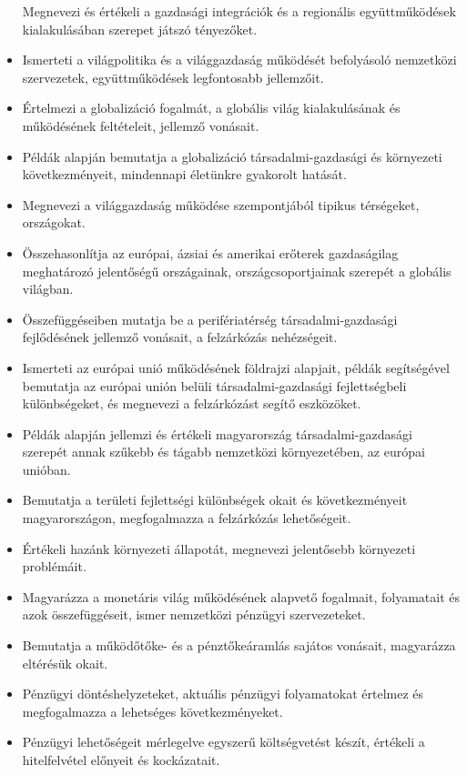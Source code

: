 \begin{itemize}
  Megnevezi és értékeli a gazdasági integrációk és a regionális
  együttműködések kialakulásában szerepet játszó tényezőket.
\item
  Ismerteti a világpolitika és a világgazdaság működését befolyásoló
  nemzetközi szervezetek, együttműködések legfontosabb jellemzőit.
\item
  Értelmezi a globalizáció fogalmát, a globális világ kialakulásának és
  működésének feltételeit, jellemző vonásait.
\item
  Példák alapján bemutatja a globalizáció társadalmi-gazdasági és
  környezeti következményeit, mindennapi életünkre gyakorolt hatását.
\item
  Megnevezi a világgazdaság működése szempontjából tipikus térségeket,
  országokat.
\item
  Összehasonlítja az európai, ázsiai és amerikai erőterek gazdaságilag
  meghatározó jelentőségű országainak, országcsoportjainak szerepét a
  globális világban.
\item
  Összefüggéseiben mutatja be a perifériatérség társadalmi-gazdasági
  fejlődésének jellemző vonásait, a felzárkózás nehézségeit.
\item
  Ismerteti az európai unió működésének földrajzi alapjait, példák
  segítségével bemutatja az európai unión belüli társadalmi-gazdasági
  fejlettségbeli különbségeket, és megnevezi a felzárkózást segítő
  eszközöket.
\item
  Példák alapján jellemzi és értékeli magyarország társadalmi-gazdasági
  szerepét annak szűkebb és tágabb nemzetközi környezetében, az európai
  unióban.
\item
  Bemutatja a területi fejlettségi különbségek okait és következményeit
  magyarországon, megfogalmazza a felzárkózás lehetőségeit.
\item
  Értékeli hazánk környezeti állapotát, megnevezi jelentősebb környezeti
  problémáit.
\item
  Magyarázza a monetáris világ működésének alapvető fogalmait,
  folyamatait és azok összefüggéseit, ismer nemzetközi pénzügyi
  szervezeteket.
\item
  Bemutatja a működőtőke- és a pénztőkeáramlás sajátos vonásait,
  magyarázza eltérésük okait.
\item
  Pénzügyi döntéshelyzeteket, aktuális pénzügyi folyamatokat értelmez és
  megfogalmazza a lehetséges következményeket.
\item
  Pénzügyi lehetőségeit mérlegelve egyszerű költségvetést készít,
  értékeli a hitelfelvétel előnyeit és kockázatait.

\end{itemize}
